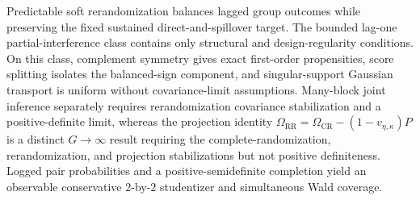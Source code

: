 Predictable soft rerandomization balances lagged group outcomes while preserving the fixed sustained direct-and-spillover target.  The bounded lag-one partial-interference class contains only structural and design-regularity conditions.  On this class, complement symmetry gives exact first-order propensities, score splitting isolates the balanced-sign component, and singular-support Gaussian transport is uniform without covariance-limit assumptions.  Many-block joint inference separately requires rerandomization covariance stabilization and a positive-definite limit, whereas the projection identity \(\Omega_{\mathrm{RR}}=\Omega_{\mathrm{CR}}-(1-v_{\eta,\kappa})P\) is a distinct \(G\to\infty\) result requiring the complete-randomization, rerandomization, and projection stabilizations but not positive definiteness.  Logged pair probabilities and a positive-semidefinite completion yield an observable conservative \(2\)-by-\(2\) studentizer and simultaneous Wald coverage.